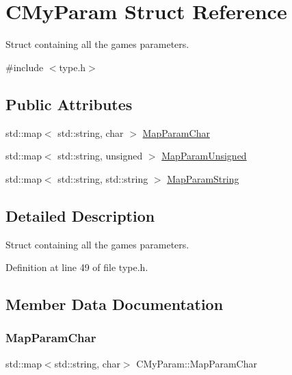 \hypertarget{struct_c_my_param}{}\section{C\+My\+Param Struct Reference}
\label{struct_c_my_param}


Struct containing all the game\textquotesingle{}s parameters.  




{\ttfamily \#include $<$type.\+h$>$}

\subsection*{Public Attributes}
\begin{DoxyCompactItemize}
\item 
std\+::map$<$ std\+::string, char $>$ \hyperlink{struct_c_my_param_ac38ede5a509bd268e749bc9c960466d3}{Map\+Param\+Char}
\item 
std\+::map$<$ std\+::string, unsigned $>$ \hyperlink{struct_c_my_param_aece7d4bdf4103e359f769d08e97a459d}{Map\+Param\+Unsigned}
\item 
std\+::map$<$ std\+::string, std\+::string $>$ \hyperlink{struct_c_my_param_a6f22660b5eff76608f47c52930e6ecf1}{Map\+Param\+String}
\end{DoxyCompactItemize}


\subsection{Detailed Description}
Struct containing all the game\textquotesingle{}s parameters. 

Definition at line 49 of file type.\+h.



\subsection{Member Data Documentation}
\mbox{\label{struct_c_my_param_ac38ede5a509bd268e749bc9c960466d3}} 
\subsubsection{\texorpdfstring{Map\+Param\+Char}{MapParamChar}}
{\footnotesize\ttfamily std\+::map$<$std\+::string, char$>$ C\+My\+Param\+::\+Map\+Param\+Char}

